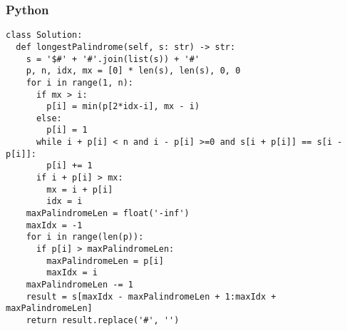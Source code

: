 \subsubsection{Python}

\begin{verbatim}
class Solution:
  def longestPalindrome(self, s: str) -> str:
    s = '$#' + '#'.join(list(s)) + '#'
    p, n, idx, mx = [0] * len(s), len(s), 0, 0
    for i in range(1, n):
      if mx > i:
        p[i] = min(p[2*idx-i], mx - i)
      else:
        p[i] = 1
      while i + p[i] < n and i - p[i] >=0 and s[i + p[i]] == s[i - p[i]]:
        p[i] += 1
      if i + p[i] > mx:
        mx = i + p[i]
        idx = i
    maxPalindromeLen = float('-inf')
    maxIdx = -1
    for i in range(len(p)):
      if p[i] > maxPalindromeLen:
        maxPalindromeLen = p[i]
        maxIdx = i
    maxPalindromeLen -= 1
    result = s[maxIdx - maxPalindromeLen + 1:maxIdx + maxPalindromeLen]
    return result.replace('#', '')
\end{verbatim}
